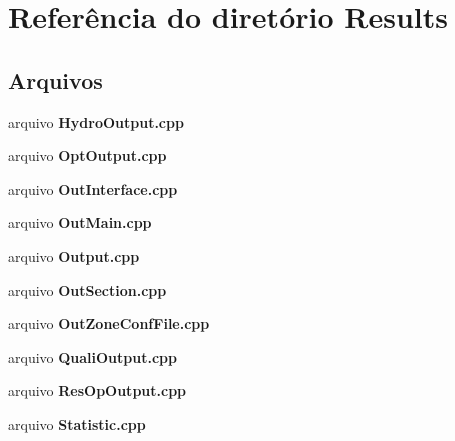 \section{Referência do diretório Results}
\label{dir_98029a2a74ba21fed1dc762df55edb85}
\subsection*{Arquivos}
\begin{DoxyCompactItemize}
\item 
arquivo {\bf Hydro\+Output.\+cpp}
\item 
arquivo {\bf Opt\+Output.\+cpp}
\item 
arquivo {\bf Out\+Interface.\+cpp}
\item 
arquivo {\bf Out\+Main.\+cpp}
\item 
arquivo {\bf Output.\+cpp}
\item 
arquivo {\bf Out\+Section.\+cpp}
\item 
arquivo {\bf Out\+Zone\+Conf\+File.\+cpp}
\item 
arquivo {\bf Quali\+Output.\+cpp}
\item 
arquivo {\bf Res\+Op\+Output.\+cpp}
\item 
arquivo {\bf Statistic.\+cpp}
\end{DoxyCompactItemize}
